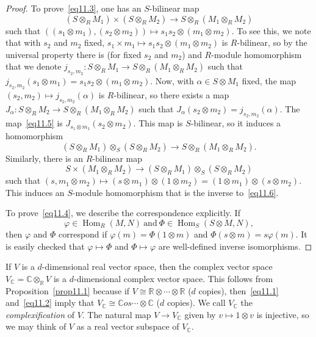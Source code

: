 \documentclass[12pt,reqno]{book}%
\theoremstyle{definition}
\theoremstyle{remark}
\theoremstyle{theorem}
\theoremstyle{remark}
\DeclareMathOperator{\Hom}{Hom}
\begin{document}
\begin{proof}
    To prove~\eqref{eq11.3}, one has an $S$-bilinear map
    \begin{equation}\label{eq11.5}
        (S \otimes_{R} M_1) \times (S \otimes_{R} M_2) \to S \otimes_{R} (M_1 \otimes_{R} M_2)
    \end{equation}
    such that $((s_1 \otimes m_1), (s_2 \otimes m_2)) \mapsto s_1s_2 \otimes (m_1 \otimes m_2)$.
    To see this, we note that with $s_2$ and $m_2$ fixed, $s_1 \times m_1 \mapsto s_1s_2 \otimes (m_1 \otimes m_2)$ is $R$-bilinear, so by the universal property there is (for fixed $s_2$ and $m_2$) and $R$-module homomorphism that we denote $j_{s_2, m_2} : S \otimes_{R} M_1 \to S \otimes_{R} (M_1 \otimes_{R} M_2)$ such that $j_{s_2, m_2}(s_1 \otimes m_1) = s_1s_2 \otimes (m_1 \otimes m_2)$.
    Now, with $\alpha \in S \otimes M_1$ fixed, the map $(s_2, m_2) \mapsto j_{s_2, m_2}(\alpha)$ is $R$-bilinear, so there exists a map $J_\alpha : S \otimes_{R} M_2 \to S \otimes_{R} (M_1 \otimes_{R} M_2)$ such that $J_\alpha(s_2 \otimes m_2) = j_{s_2, m_2}(\alpha)$.
    The map~\eqref{eq11.5} is $J_{s_1 \otimes m_1}(s_2 \otimes m_2)$.
    This map is $S$-bilinear, so it induces a homomorphism
    \begin{equation}\label{eq11.6}
        (S \otimes_{R} M_1) \otimes_{S} (S \otimes_{R} M_2) \to S \otimes_{R} (M_1 \otimes_{R} M_2).
    \end{equation}
    Similarly, there is an $R$-bilinear map
    \[
        S \times (M_1 \otimes_{R} M_2) \to (S \otimes_{R} M_1) \otimes_{S} (S \otimes_{R} M_2)
    \]
    such that $(s, m_1 \otimes m_2) \mapsto (s \otimes m_1) \otimes (1 \otimes m_2) = (1 \otimes m_1) \otimes (s \otimes m_2)$.
    This induces an $S$-module homomorphism that is the inverse to~\eqref{eq11.6}.

    To prove~\eqref{eq11.4}, we describe the correspondence explicitly.
    If
    \[
        \varphi \in \Hom_R(M, N) \ \text{and} \ \Phi \in \Hom_S(S \otimes M, N),
    \]
    then $\varphi$ and $\Phi$ correspond if $\varphi(m) = \Phi(1 \otimes m)$ and $\Phi(s \otimes m) = s \varphi(m)$.
    It is easily checked that $\varphi \mapsto \Phi$ and $\Phi \mapsto \varphi$ are well-defined inverse isomorphisms.
\end{proof}%

If $V$ is a $d$-dimensional real vector space, then the complex vector space $V_\mathbb{C} = \mathbb{C} \otimes_{\mathbb{R}} V$ is a $d$-dimensional complex vector space.
This follows from Proposition~\ref{prop11.1} because if $V \cong \mathbb{R} \otimes \cdots \otimes \mathbb{R}$ ($d$ copies), then~\eqref{eq11.1} and~\eqref{eq11.2} imply that $V_\mathbb{C} \cong \mathbb{C} os \cdots \otimes \mathbb{C}$ ($d$ copies).
We call $V_\mathbb{C}$ the \emph{complexification} of $V$.
The natural map $V \to V_\mathbb{C}$ given by $v \mapsto 1 \otimes v$ is injective, so we may think of $V$ as a real vector subspace of $V_\mathbb{C}$.
\end{document}
